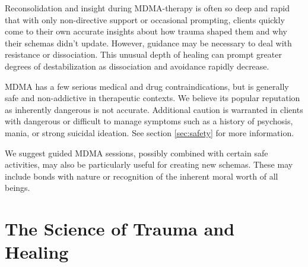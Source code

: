 \documentclass[12pt,letterpaper]{article}
\begin{document}
Reconsolidation and insight during MDMA-therapy is often so deep and rapid that with only non-directive support or occasional prompting, clients quickly come to their own accurate insights about how trauma shaped them and why their schemas didn't update. However, guidance may be necessary to deal with resistance or dissociation. This unusual depth of healing can prompt greater degrees of destabilization as dissociation and avoidance rapidly decrease.

MDMA has a few serious medical and drug contraindications, but is generally safe and non-addictive in therapeutic contexts. We believe its popular reputation as inherently dangerous is not accurate. Additional caution is warranted in clients with dangerous or difficult to manage symptoms such as a history of psychosis, mania, or strong suicidal ideation. See section \ref{sec:safety} for more information.

We suggest guided MDMA sessions, possibly combined with certain safe activities, may also be particularly useful for creating new schemas. These may include bonds with nature or recognition of the inherent moral worth of all beings.
\section{The Science of Trauma and Healing}
\end{document}
